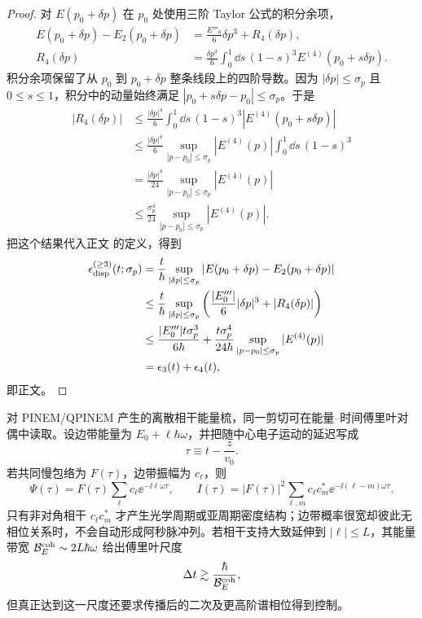 \begin{proof}
对 $E(p_0+\delta p)$ 在 $p_0$ 处使用三阶 Taylor 公式的积分余项，
\begin{align*}
E(p_0+\delta p)-E_2(p_0+\delta p)
&=\frac{E'''_0}{6}\delta p^3+R_4(\delta p),\\
R_4(\delta p)
&=\frac{\delta p^4}{6}
\int_0^1\dd s\,(1-s)^3
E^{(4)}(p_0+s\delta p).
\end{align*}
积分余项保留了从 $p_0$ 到 $p_0+\delta p$ 整条线段上的四阶导数。因为 $|\delta p|\le\sigma_p$ 且 $0\le s\le1$，积分中的动量始终满足 $|p_0+s\delta p-p_0|\le\sigma_p$。于是
\begin{align*}
|R_4(\delta p)|
&\le\frac{|\delta p|^4}{6}
\int_0^1\dd s\,(1-s)^3
\left|E^{(4)}(p_0+s\delta p)\right|\\
&\le\frac{|\delta p|^4}{6}
\sup_{|p-p_0|\le\sigma_p}|E^{(4)}(p)|
\int_0^1\dd s\,(1-s)^3\\
&=\frac{|\delta p|^4}{24}
\sup_{|p-p_0|\le\sigma_p}|E^{(4)}(p)|\\
&\le\frac{\sigma_p^4}{24}
\sup_{|p-p_0|\le\sigma_p}|E^{(4)}(p)|.
\end{align*}
把这个结果代入正文 的定义，得到
\begin{align*}
\epsilon_{\rm disp}^{(\ge3)}(t;\sigma_p)
&=\frac{t}{\hbar}
\sup_{|\delta p|\le\sigma_p}
\left|E(p_0+\delta p)-E_2(p_0+\delta p)\right|\\
&\le
\frac{t}{\hbar}
\sup_{|\delta p|\le\sigma_p}
\left(\frac{|E'''_0|}{6}|\delta p|^3+|R_4(\delta p)|\right)\\
&\le
\frac{|E'''_0|t\sigma_p^3}{6\hbar}
+\frac{t\sigma_p^4}{24\hbar}
\sup_{|p-p_0|\le\sigma_p}|E^{(4)}(p)|\\
&=\epsilon_3(t)+\epsilon_4(t),
\end{align*}
即正文。
\end{proof}


对 PINEM/QPINEM 产生的离散相干能量梳，同一剪切可在能量--时间傅里叶对偶中读取。设边带能量为 $E_0+\ell\hbar\omega$，并把随中心电子运动的延迟写成
\[
\tau\equiv t-\frac{z}{v_0}.
\]
若共同慢包络为 $F(\tau)$，边带振幅为 $c_\ell$，则
\begin{equation}
\boxed{
\Psi(\tau)=F(\tau)\sum_\ell c_\ell\ee^{-\ii\ell\omega\tau},
\qquad
I(\tau)=|F(\tau)|^2
\sum_{\ell,m}c_\ell c_m^*\ee^{-\ii(\ell-m)\omega\tau}.}
\label{eq:coherent_energy_comb_time_amplitude}
\end{equation}
只有非对角相干 $c_\ell c_m^*$ 才产生光学周期或亚周期密度结构；边带概率很宽却彼此无相位关系时，不会自动形成阿秒脉冲列。若相干支持大致延伸到 $|\ell|\le L$，其能量带宽 $\mathcal B_E^{\rm coh}\sim2L\hbar\omega$ 给出傅里叶尺度
\[
\Delta t\gtrsim\frac{\hbar}{\mathcal B_E^{\rm coh}},
\]
但真正达到这一尺度还要求传播后的二次及更高阶谱相位得到控制。

